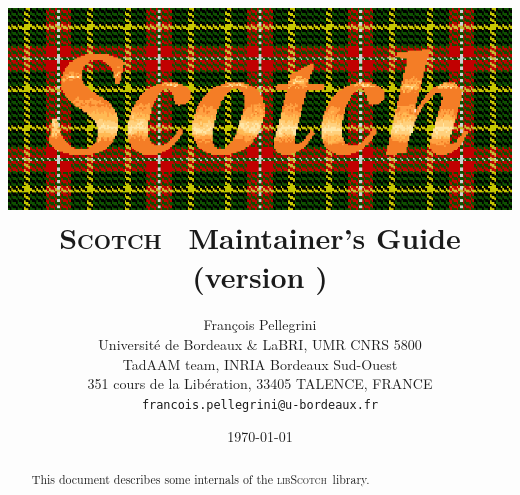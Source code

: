 \documentclass{article}
\newcommand{\scotch}{\textsc{Scotch}}            %
\newcommand{\libscotch}{\textsc{libScotch}}      %
\begin{document}
\date{\today}

\title{\includegraphics{../misc/scotch_logo_color.ps}\\[1em]
       {\LARGE\bf \scotch\ \textsc{\scotchver} Maintainer's Guide}\\[1em]%
       {\normalsize (version \scotchversub)}
}

\author{Fran\c cois Pellegrini\\
Universit\'e de Bordeaux \& LaBRI, UMR CNRS 5800\\
TadAAM team, INRIA Bordeaux Sud-Ouest\\
351 cours de la Lib\'eration, 33405 TALENCE, FRANCE\\
{\tt francois.pellegrini@u-bordeaux.fr}}

\maketitle

\begin{abstract}
This document describes some internals of the \libscotch\
library.
\end{abstract}

\clearpage

\tableofcontents

\end{document}
